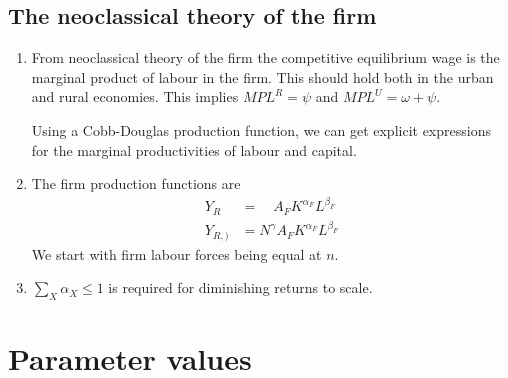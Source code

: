 \subsection{The neoclassical theory of the firm}
\begin{enumerate}
    \item From neoclassical theory of the firm the competitive equilibrium wage is the  marginal product of labour in the firm.      This should hold both in the urban and rural economies. This implies       $ MPL^R=\psi$  and $ MPL^U=\omega+\psi $.

    Using a Cobb-Douglas production function, we can get explicit expressions for the marginal productivities of labour and capital. 
\item The firm production functions are 
\begin{align}
Y_R  &= \quad  A_FK^{\alpha_F}L^{\beta_F}\\
Y_{R, )} &= N^\gamma A_FK^{\alpha_F}L^{\beta_F}
\end{align}
We start with firm labour forces  being equal at $n$.

\item $\sum_X \alpha_X \le 1$ is required for diminishing returns to scale. 

\end{enumerate}


\section{Parameter values}\label{sec-param-values}

